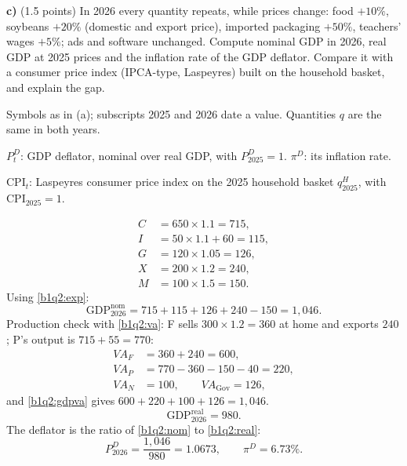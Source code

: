 \textbf{c)} (1.5 points) In 2026 every quantity repeats, while prices change: food $+10\%$, soybeans $+20\%$ (domestic and
export price), imported packaging $+50\%$, teachers' wages $+5\%$; ads and software unchanged. Compute nominal GDP in 2026, real GDP at
2025 prices and the inflation rate of the GDP deflator. Compare it with a consumer price index (IPCA-type, Laspeyres) built on the
household basket, and explain the gap.
\resolespaco
\begin{sol}
\begin{notacao}
\item Symbols as in (a); subscripts 2025 and 2026 date a value. Quantities $q$ are the same in both years.
\item $P^D_t$: GDP deflator, nominal over real GDP, with $P^D_{2025}=1$. $\pi^D$: its inflation rate.
\item $\text{CPI}_t$: Laspeyres consumer price index on the 2025 household basket $q^H_{2025}$, with $\text{CPI}_{2025}=1$.
\end{notacao}
\begin{align*}
C&=650\times1.1=715,\\
I&=50\times1.1+60=115,\\
G&=120\times1.05=126,\\
X&=200\times1.2=240,\\
M&=100\times1.5=150.
\end{align*}
Using \eqref{b1q2:exp}:
\begin{equation}
\text{GDP}^{\text{nom}}_{2026}=715+115+126+240-150=1{,}046. \label{b1q2:nom}
\end{equation}
Production check with \eqref{b1q2:va}: F sells $300\times1.2=360$ at home and exports $240$; P's output is $715+55=770$:
\begin{align*}
VA_F&=360+240=600,\\
VA_P&=770-360-150-40=220,\\
VA_N&=100,\qquad VA_{\text{Gov}}=126,
\end{align*}
and \eqref{b1q2:gdpva} gives $600+220+100+126=1{,}046$.
\begin{equation}
\text{GDP}^{\text{real}}_{2026}=980. \label{b1q2:real}
\end{equation}
The deflator is the ratio of \eqref{b1q2:nom} to \eqref{b1q2:real}:
\[
P^D_{2026}=\frac{1{,}046}{980}=1.0673,\qquad \pi^D=6.73\% .
\]
\end{sol}
